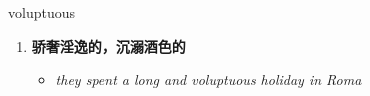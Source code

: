 
\begin{frame}
{\huge voluptuous}
\begin{center}
\begin{enumerate}\Large
  \item \textbf{骄奢淫逸的，沉溺酒色的}
  \begin{itemize}
    \item \em{\Large{they spent a long and voluptuous holiday in Roma}}
  \end{itemize}
\end{enumerate}
\end{center}
\end{frame}

